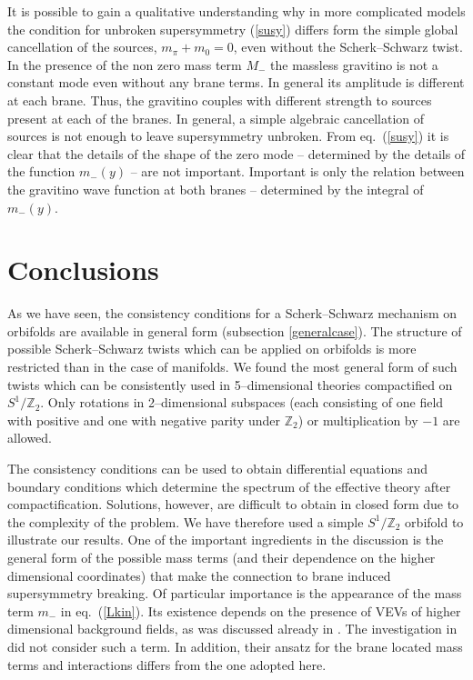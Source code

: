 \documentclass[a4paper,12pt]{article}
\def\ZZ{\mathbb Z}
\begin{document}
It is possible to gain a qualitative understanding why in more
complicated models the condition for unbroken supersymmetry
(\ref{susy}) differs form the simple global cancellation of the
sources, $m_\pi+m_0=0$, even without the Scherk--Schwarz twist.  
In the presence of the non zero mass term $M_-$ the massless gravitino
is not a constant mode even without any brane terms. In general its
amplitude is different at each brane. Thus, the gravitino 
couples with different strength to sources present at each of the
branes. In general, a simple algebraic cancellation of sources is not
enough to leave supersymmetry unbroken. From eq.\ (\ref{susy}) it is
clear that the details of the shape of the zero mode -- determined by
the details of the function $m_-(y)$ -- are not important. Important
is only the relation between the gravitino wave function at both
branes -- determined by the integral of $m_-(y)$.


\section{Conclusions}


As we have seen, the consistency conditions for a Scherk--Schwarz
mechanism on orbifolds are available in general form  
(subsection \ref{generalcase}). The structure of possible
Scherk--Schwarz twists which can be applied on orbifolds is more
restricted than in the case of manifolds. We found the most general
form of such twists which can be consistently used in 5--dimensional
theories compactified on $S^1/\ZZ_2$. Only rotations in 2--dimensional
subspaces (each consisting of one field with positive and one with
negative parity under $\ZZ_2$) or multiplication by $-1$ are allowed.


The consistency conditions can be used to obtain
differential equations and boundary conditions which determine the
spectrum of the effective theory after compactification.
Solutions, however, are difficult to obtain in closed form due to the
complexity of the problem. We have therefore used a simple $S^1/\ZZ_2$
orbifold to illustrate our results. One of the important ingredients
in the discussion is the general form of the possible mass terms (and
their dependence on the higher dimensional coordinates) that make the
connection to brane induced supersymmetry breaking. Of particular
importance is the appearance of the mass term $m_-$ in eq.\
(\ref{Lkin}). Its existence depends on the presence of VEVs of higher 
dimensional background fields, as was discussed already in
\cite{Meissner:1999ja}. The investigation in
\cite{Bagger:2001qi,Bagger:2001ep} did not consider such a term. 
In addition, their ansatz for the brane located mass terms and
interactions differs from the one adopted here.
\end{document}
